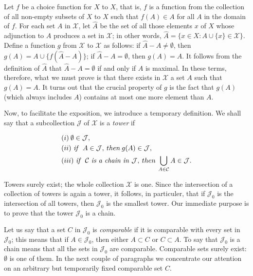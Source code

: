 Let $f$ be a choice function for $X$ to $X$, that is, $f$ is a function from the collection of all non-empty subsets of $X$ to $X$ such that $f(A) \in A$ for all $A$ in the domain of $f$. For each set $A$ in $\mathcal{X}$, let $\hat{A}$ be the set of all those elements $x$ of $X$ whose adjunction to $A$ produces a set in $\mathcal{X}$; in other words, $\hat{A} =\{ x \in X:A \cup \{ x \} \in \mathcal{X} \}$. Define a function $g$ from $\mathcal{X}$ to $\mathcal{X}$ as follows: if $\hat{A} - A \neq \emptyset $, then $g(A) = A \cup \{ f( \hat{A} - A) \}$; if $\hat{A} - A = \emptyset$, then $g(A) = A$. It follows from the definition of $\hat{A}$ that $\hat{A} - A = \emptyset$ if and only if $A$ is maximal. In these terms, therefore, what we must prove is that there exists in $\mathcal{X}$ a set $A$ such that $g(A) = A$. It turns out that the crucial property of $g$ is the fact that $g(A)$ (which always includes $A$) contains at most one more element than $A$.

Now, to facilitate the exposition, we introduce a temporary definition. We shall say that a subcollection $\mathcal{J}$ of $\mathcal{X}$ is a \textit{tower} if 

\begin{align*} 
&(i) \: \emptyset \in \mathcal{J} , \\
&(ii) \text{ \textit{if} } \: A \in \mathcal{J}, \: then \: g(A) \in \mathcal{J} ,\\
&(iii) \text{ \textit{if} } \: \mathcal{C} \text{ \textit{is a chain in} } \mathcal{J}, \: then \: \bigcup_{A \in \mathcal{C}} A \in \mathcal{J}. 
\end{align*}

Towers surely exist; the whole collection $\mathcal{X}$ is one. Since the intersection of a collection of towers is again a tower, it follows, in particuler, that if $\mathcal{J}_{0}$ is the intersection of all towers, then $\mathcal{J}_{0}$ is the smallest tower. Our immediate purpose is to prove that the tower $\mathcal{J}_{0}$ is a chain. 

Let us say that a set $C$ in $\mathcal{J}_{0}$ is \textit{comparable} if it is comparable with every set in $\mathcal{J}_{0}$; this means that if $A \in \mathcal{J}_{0}$, then either $A \subset C$ or $C \subset A$. To say that $\mathcal{J}_{0}$ is a chain means that all the sets in $\mathcal{J}_{0}$ are comparable. Comparable sets surely exist: $\emptyset$ is one of them. In the next couple of paragraphs we concentrate our attention on an arbitrary but temporarily fixed comparable set $C$. 

